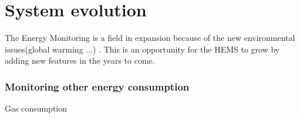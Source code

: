 \chapter{System evolution}
\label{ch:evolution}
The Energy Monitoring is a field in expansion because of the new environmental issues(global warming ...) . This is an opportunity for the HEMS to grow by adding new features in the years to come.

 \subsection{Monitoring other energy consumption}
 Gas consumption
